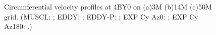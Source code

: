 \begin{figure}[t]
     \caption{Circumferential velocity profiles at 4BY0 on (a)3M (b)14M (c)50M grid. (MUSCL: \mline; EDDY: \eline; EDDY-P: \epline; EXP Cy Az0: \bluecrx; EXP Cy Az180: \redcrx.)}
     \label{v}    
\end{figure}
